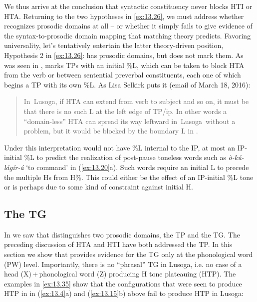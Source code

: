 \documentclass[output=paper]{langsci/langscibook}
\begin{document}
We thus arrive at the conclusion that syntactic constituency never blocks \gls{HTI}
or \gls{HTA}. Returning to the two hypotheses in \eqref{ex:13.26}, we must address
whether  recognizes prosodic domains at all -- or whether it simply fails to
give evidence of the syntax-to-prosodic domain mapping that
 matching theory predicts. Favoring universality, let’s
tentatively entertain the latter theory-driven position, Hypothesis 2 in
\eqref{ex:13.26}:  has prosodic domains, but does not mark them. As was
seen in ,  marks TPs with an initial \%L, which can
be taken to block \gls{HTA} from the verb or between sentential preverbal
constituents, each one of which begins a TP with its own \%L. As Lisa Selkirk
puts it (email of March 18, 2016):

\begin{quotation}

In~Lusoga, if \gls{HTA} can extend from verb to subject and so on, it must be
that there is no such L at the left edge of TP/ip. In other words a
``domain-less'' \gls{HTA} can spread its way leftward in~Lusoga~without a
problem, but it would be blocked by the boundary L in .

\end{quotation}
Under this interpretation  would not have \%L internal to the \gls{IP},
at most an \gls{IP}-initial \%L to predict the realization of post-pause
toneless words such as \emph{ò-kú-lágír-á} ‘to command’ in (\ref{ex:13.20}a).
Such words require an initial L to precede the multiple Hs from H\%. This could
either be the effect of an IP-initial \%L tone or is perhaps due to some kind
of constraint against initial H.

\subsection{The TG}\label{sub:13.3.3}

In  we saw that  distinguishes two prosodic domains, the
\gls{TP} and the \gls{TG}. The preceding discussion of \gls{HTA} and \gls{HTI}
have both addressed the TP. In this section we show that  provides
evidence for the \gls{TG} only at the phonological word (\gls{PW})
level. Importantly, there is no “phrasal” \gls{TG} in Lusoga, i.e. no case of a
head (X)\,$+$\,phonological word (Z) producing H tone plateauing (\gls{HTP}). The
examples in \eqref{ex:13.35} show that the configurations that were seen to
produce \gls{HTP} in  in (\ref{ex:13.4}a) and (\ref{ex:13.15}b)
above fail to produce \gls{HTP} in Lusoga:
\end{document}
